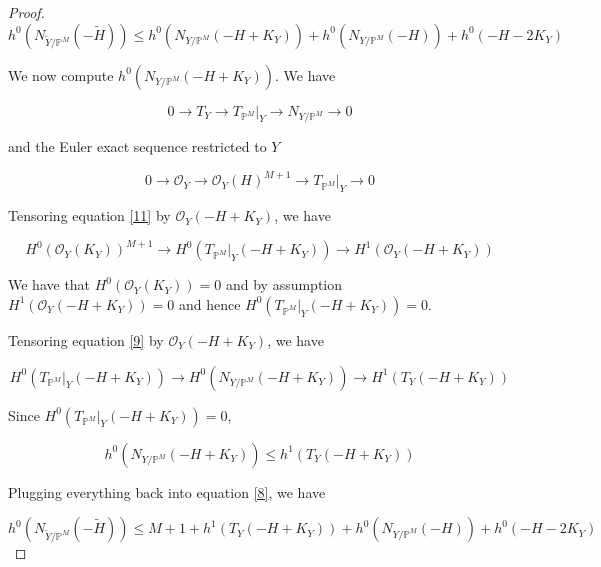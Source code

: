 \documentclass[11pt,twoside]{amsart}
\theoremstyle{plain}
\numberwithin{equation}{section}
\theoremstyle{definition}
\begin{document}
\begin{proof}
\begin{equation}\label{8}
h^0(N_{\widetilde{Y}/\mathbb{P}^M}(-\widetilde{H})) \leq  h^0(N_{Y/\mathbb{P}^M}(-H+K_Y)) + h^0(N_{Y/\mathbb{P}^M}(-H)) + h^0(-H-2K_Y)
\end{equation}

We now compute $h^0(N_{Y/\mathbb{P}^M}(-H+K_Y))$. 
We have

\begin{equation}\label{9}
   0 \to T_Y \to T_{\mathbb{P}^M}|_Y \to N_{Y/\mathbb{P}^M} \to 0 
\end{equation}




and the Euler exact sequence restricted to $Y$

\begin{equation}\label{11}
   0 \to \mathcal{O}_Y \to \mathcal{O}_Y(H)^{M+1} \to T_{\mathbb{P}^M}|_Y \to 0 
\end{equation}





Tensoring equation \ref{11} by $\mathcal{O}_Y(-H+K_Y)$, we have 

\begin{equation*}
     H^0(\mathcal{O}_Y(K_Y))^{M+1} \to H^0(T_{\mathbb{P}^M}|_Y(-H+K_Y)) \to H^1(\mathcal{O}_Y(-H+K_Y)) 
\end{equation*}

We have that $H^0(\mathcal{O}_Y(K_Y)) = 0$ and by assumption $H^1(\mathcal{O}_Y(-H+K_Y)) = 0$ and hence $H^0(T_{\mathbb{P}^M}|_Y(-H+K_Y)) = 0$. 




Tensoring equation \ref{9} by $\mathcal{O}_Y(-H+K_Y)$, we have 

\begin{equation*}
    H^0(T_{\mathbb{P}^M}|_Y(-H+K_Y)) \to H^0(N_{Y/\mathbb{P}^M}(-H+K_Y)) \to H^1(T_Y(-H+K_Y))
\end{equation*}

Since $H^0(T_{\mathbb{P}^M}|_Y(-H+K_Y)) = 0$, 

\begin{equation}\label{14}
    h^0(N_{Y/\mathbb{P}^M}(-H+K_Y)) \leq h^1(T_Y(-H+K_Y))
\end{equation}

Plugging everything back into equation \ref{8}, we have

\begin{equation}\label{15}
h^0(N_{\widetilde{Y}/\mathbb{P}^M}(-\widetilde{H})) \leq  M+1 + h^1(T_Y(-H+K_Y)) + h^0(N_{Y/\mathbb{P}^M}(-H)) + h^0(-H-2K_Y)
\end{equation}



\end{proof}
\end{document}
